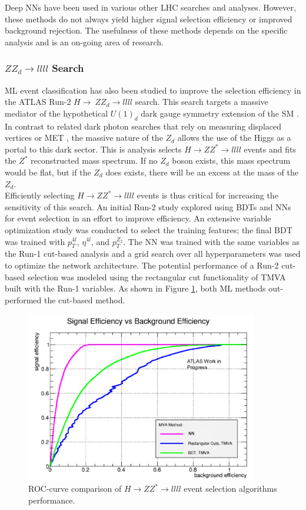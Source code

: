 Deep NNs have been used in various other LHC searches and analyses. However, these methods do not always yield higher signal selection efficiency or improved background rejection. The usefulness of these methods depends on the specific analysis and is an on-going area of research. 

\subsubsection{$ZZ_d\rightarrow llll$ Search}
ML event classification has also been studied to improve the selection efficiency in the ATLAS Run-2 $H\rightarrow\ ZZ_d \rightarrow llll$ search. This search targets a massive mediator of the hypothetical $U(1)_d$ dark gauge symmetry extension of the SM \cite{zzd_paper}. In contrast to related dark photon searches that rely on measuring displaced vertices or MET \cite{dark_photon_paper}, the massive nature of the $Z_d$ allows the use of the Higgs as a portal to this dark sector. This is analysis selects $H\rightarrow ZZ^* \rightarrow llll$ events and fits the $Z^*$ reconstructed mass spectrum. If no $Z_d$ boson exists, this mass spectrum would be flat, but if the $Z_d$ does exists, there will be an excess at the mass of the $Z_d$.\\

Efficiently selecting $H\rightarrow ZZ^* \rightarrow llll$ events is thus critical for increasing the sensitivity of this search. An initial Run-2 study explored using BDTs and NNs for event selection in an effort to improve efficiency. An extensive variable optimization study was conducted to select the training features; the final BDT was trained with $p_T^{4l}$, $\eta^{4l}$, and $p_T^{Z_2}$. The NN was trained with the same variables as the Run-1 cut-based analysis and a grid search over all hyperparameters was used to optimize the network architecture. The potential performance of a Run-2 cut-based selection was modeled using the rectangular cut functionality of TMVA built with the Run-1 variables. As shown in Figure \ref{fig:zzd_roc}, both ML methods out-performed the cut-based method. 

\begin{figure}[htb!]
    \centering
    \includegraphics[width=4in]{figures/chapter4/zzd_roc.png}
    \caption{ROC-curve comparison of $H\rightarrow ZZ^* \rightarrow llll$ event selection algorithms performance.}
    \label{fig:zzd_roc}
\end{figure}


